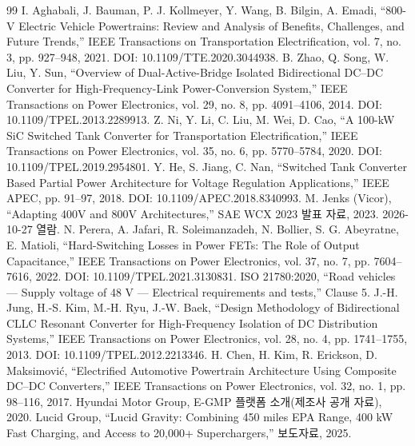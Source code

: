 \begin{thebibliography}{99}
 I. Aghabali, J. Bauman, P. J. Kollmeyer, Y. Wang, B. Bilgin, A. Emadi, “800-V Electric Vehicle Powertrains: Review and Analysis of Benefits, Challenges, and Future Trends,” IEEE Transactions on Transportation Electrification, vol. 7, no. 3, pp. 927–948, 2021. DOI: 10.1109/TTE.2020.3044938.
 B. Zhao, Q. Song, W. Liu, Y. Sun, “Overview of Dual-Active-Bridge Isolated Bidirectional DC–DC Converter for High-Frequency-Link Power-Conversion System,” IEEE Transactions on Power Electronics, vol. 29, no. 8, pp. 4091–4106, 2014. DOI: 10.1109/TPEL.2013.2289913.
 Z. Ni, Y. Li, C. Liu, M. Wei, D. Cao, “A 100-kW SiC Switched Tank Converter for Transportation Electrification,” IEEE Transactions on Power Electronics, vol. 35, no. 6, pp. 5770–5784, 2020. DOI: 10.1109/TPEL.2019.2954801.
 Y. He, S. Jiang, C. Nan, “Switched Tank Converter Based Partial Power Architecture for Voltage Regulation Applications,” IEEE APEC, pp. 91–97, 2018. DOI: 10.1109/APEC.2018.8340993.
 M. Jenks (Vicor), “Adapting 400V and 800V Architectures,” SAE WCX 2023 발표 자료, 2023. 2026-10-27 열람.
 N. Perera, A. Jafari, R. Soleimanzadeh, N. Bollier, S. G. Abeyratne, E. Matioli, “Hard-Switching Losses in Power FETs: The Role of Output Capacitance,” IEEE Transactions on Power Electronics, vol. 37, no. 7, pp. 7604–7616, 2022. DOI: 10.1109/TPEL.2021.3130831.
 ISO 21780:2020, “Road vehicles — Supply voltage of 48 V — Electrical requirements and tests,” Clause 5.
 J.-H. Jung, H.-S. Kim, M.-H. Ryu, J.-W. Baek, “Design Methodology of Bidirectional CLLC Resonant Converter for High-Frequency Isolation of DC Distribution Systems,” IEEE Transactions on Power Electronics, vol. 28, no. 4, pp. 1741–1755, 2013. DOI: 10.1109/TPEL.2012.2213346.
 H. Chen, H. Kim, R. Erickson, D. Maksimovi{\fallbackfont ć}, “Electrified Automotive Powertrain Architecture Using Composite DC–DC Converters,” IEEE Transactions on Power Electronics, vol. 32, no. 1, pp. 98–116, 2017.
 Hyundai Motor Group, E-GMP 플랫폼 소개(제조사 공개 자료), 2020.
 Lucid Group, “Lucid Gravity: Combining 450 miles EPA Range, 400 kW Fast Charging, and Access to 20,000+ Superchargers,” 보도자료, 2025.
\end{thebibliography}
